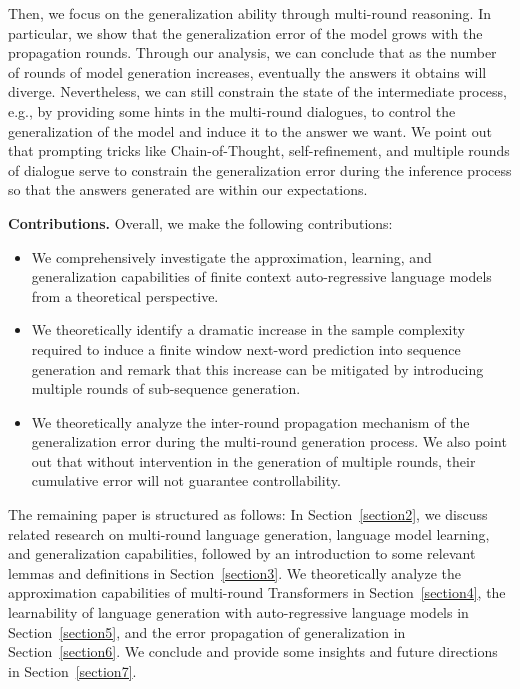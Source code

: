 Then, we focus on the generalization ability through multi-round reasoning. In particular, we show that the generalization error of the model grows with the propagation rounds. Through our analysis, we can conclude that as the number of rounds of model generation increases, eventually the answers it obtains will diverge. Nevertheless, we can still constrain the state of the intermediate process, e.g., by providing some hints in the multi-round dialogues, to control the generalization of the model and induce it to the answer we want. We point out that prompting tricks like Chain-of-Thought, self-refinement, and multiple rounds of dialogue serve to constrain the generalization error during the inference process so that the answers generated are within our expectations.

\textbf{Contributions.} Overall, we make the following contributions:
\begin{itemize}
    \item We comprehensively investigate the approximation, learning, and generalization capabilities of finite context auto-regressive language models from a theoretical perspective.
    \item We theoretically identify a dramatic increase in the sample complexity required to induce a finite window next-word prediction into sequence generation and remark that this increase can be mitigated by introducing multiple rounds of sub-sequence generation.
    \item We theoretically analyze the inter-round propagation mechanism of the generalization error during the multi-round generation process. We also point out that without intervention in the generation of multiple rounds, their cumulative error will not guarantee controllability. %
\end{itemize}

The remaining paper is structured as follows: In Section~\ref{section2}, we discuss related research on multi-round language generation, language model learning, and generalization capabilities, followed by an introduction to some relevant lemmas and definitions in Section~\ref{section3}. We theoretically analyze the approximation capabilities of multi-round Transformers in Section~\ref{section4}, the learnability of language generation with auto-regressive language models in Section~\ref{section5}, and the error propagation of generalization in Section~\ref{section6}. We conclude and provide some insights and future directions in Section~\ref{section7}.